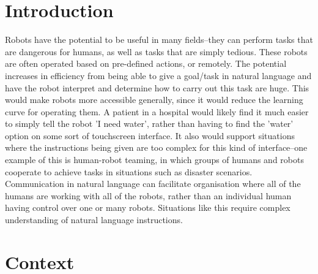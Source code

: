 \documentclass{article}
\begin{document}
\section{Introduction}
Robots have the potential to be useful in many fields–they can perform tasks
that are dangerous for humans, as well as tasks that are simply tedious. These
robots are often operated based on pre-defined actions, or remotely. The potential increases in efficiency from being able to give a goal/task in natural language and have the robot interpret and determine how to carry out this task are huge. %
This would make robots more accessible generally, since it would reduce the
learning curve for operating them. A patient in a hospital would likely find it much easier to simply tell the robot 'I need water', rather than having to find the 'water' option on some sort of touchscreen interface. It also would support situations where the instructions being given are too complex for this kind of interface--one example of this is human-robot teaming, in which groups of humans and robots cooperate to achieve tasks in situations such as disaster scenarios\cite{Kruijff-Korbayova:2015aa}. Communication in natural language can facilitate organisation where all of the humans are working with all of the robots, rather than an individual human having control over one or many robots. Situations like this require complex understanding of natural language instructions. 


\section{Context}
\end{document}
